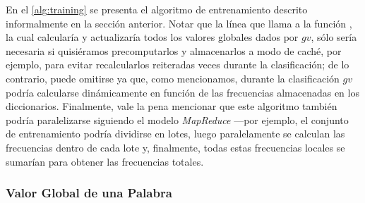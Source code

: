 En el \autoref{alg:training} se presenta el algoritmo de entrenamiento descrito informalmente en la sección anterior.
Notar que la línea que llama a la función , la cual calcularía y actualizaría todos los valores globales dados por $gv$, sólo sería necesaria si quisiéramos precomputarlos y almacenarlos a modo de caché, por ejemplo, para evitar recalcularlos reiteradas veces durante la clasificación;
de lo contrario, puede omitirse ya que, como mencionamos, durante la clasificación $gv$ podría calcularse dinámicamente en función de las frecuencias almacenadas en los diccionarios.
Finalmente, vale la pena mencionar que este algoritmo también podría paralelizarse siguiendo el modelo \emph{MapReduce} ---por ejemplo, el conjunto de entrenamiento podría dividirse en lotes, luego paralelamente se calculan las frecuencias dentro de cada lote y, finalmente, todas estas frecuencias locales se sumarían para obtener las frecuencias totales.


\subsubsection{Valor Global de una Palabra}
\label{sec:local_global_value}

